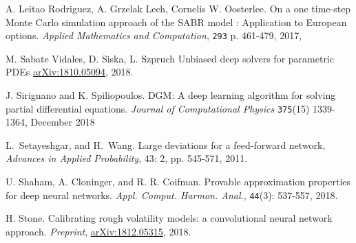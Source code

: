 \documentclass{article}
\theoremstyle{remark}
\begin{document}
\begin{thebibliography}{99}
A. Leitao Rodriguez, A. Grzelak Lech, Cornelis W. Oosterlee.
On a one time-step Monte Carlo simulation approach of the SABR model : Application to European options.
\textit{Applied Mathematics and Computation}, {\tt 293} p. 461-479, 2017,

 M. Sabate Vidales, D. Siska, L. Szpruch
Unbiased deep solvers for parametric PDEs
\href{https://arxiv.org/abs/1810.05094}{arXiv:1810.05094}, 2018.


J. Sirignano and K. Spiliopoulos.
DGM: A deep learning algorithm for solving partial differential equations.
\textit{Journal of Computational Physics}
{\tt 375}(15) 1339-1364, December 2018


 L.~Setayeshgar, and H.~Wang. Large deviations for a feed-forward network, \textit{Advances in Applied Probability}, 43: 2, pp. 545-571, 2011.

U. Shaham, A. Cloninger, and R. R. Coifman. 
Provable approximation properties for deep neural networks. 
\textit{Appl. Comput. Harmon. Anal.}, {\tt 44}(3): 537-557, 2018.

H. Stone. Calibrating rough volatility models: a convolutional neural network approach. \textit{Preprint}, \href{https://arxiv.org/pdf/1812.05315.pdf}{arXiv:1812.05315}, 2018.



\end{thebibliography}
\end{document}
